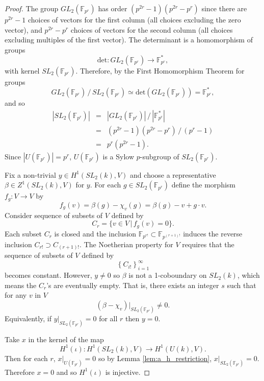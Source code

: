 \begin{proof}
	The group $GL_2(\mathbb{F}_{p^r})$ has order $(p^{2r} - 1)(p^{2r} - p^r)$ since there are $p^{2r} - 1$ choices of vectors for the first column (all choices excluding the zero vector), and $p^{2r} - p^r$ choices of vectors for the second column (all choices excluding multiples of the first vector). The determinant is a homomorphism of groups
	\begin{displaymath}
		\mathrm{det}:GL_2(\mathbb{F}_{p^r}) \rightarrow \mathbb{F}^*_{p^r},
	\end{displaymath}
	with kernel $SL_2(\mathbb{F}_{p^r})$. Therefore, by the First Homomorphism Theorem for groups
	\begin{displaymath}
		GL_2(\mathbb{F}_{p^r})\,/\,SL_2(\mathbb{F}_{p^r}) \simeq \mathrm{det}(GL_2(\mathbb{F}_{p^r})) = \mathbb{F}^*_{p^r},
	\end{displaymath}
	and so
	\begin{eqnarray*}
		|SL_2(\mathbb{F}_{p^r})|
		&=& |GL_2(\mathbb{F}_{p^r})|\,/\,|\mathbb{F}^*_{p^r}|\\
		&=& (p^{2r} - 1)(p^{2r} - p^r)\,/\,(p^r - 1)\\
		&=& p^r(p^{2r} - 1).
	\end{eqnarray*}
	Since $|U(\mathbb{F}_{p^r})| = p^r$, $U(\mathbb{F}_{p^r})$ is a Sylow $p$-subgroup of $SL_2(\mathbb{F}_{p^r})$.
	
	Fix a non-trivial $y\in H^1(SL_2(k), V)$ and choose a representative $\beta\in Z^1(SL_2(k), V)$ for $y$. For each $g\in SL_2(\mathbb{F}_{p^r})$ define the morphism $f_g:V\rightarrow V$ by
	\begin{displaymath}
		f_g(v) = \beta(g) - \chi_v(g) = \beta(g) - v + g\cdot v.
	\end{displaymath}
	Consider sequence of subsets of $V$ defined by
	\begin{displaymath}
		C_r = \{v \in V \,|\, f_g(v) = 0\}.
	\end{displaymath}
	Each subset $C_r$ is closed and the inclusion $\mathbb{F}_{p^{r!}} \subset \mathbb{F}_{p^{(r+1)!}}$ induces the reverse inclusion $C_{r!} \supset C_{(r+1)!}$. The Noetherian property for $V$ requires that the sequence of subsets of $V$ defined by
	\begin{displaymath}
		\left\{C_{i!}\right\}_{i = 1}^\infty
	\end{displaymath}
	becomes constant. However, $y\neq 0$ so $\beta$ is not a 1-coboundary on $SL_2(k)$, which means the $C_r$'s are eventually empty. That is, there exists an integer $s$ such that for any $v$ in $V$
	\begin{displaymath}
		(\beta - \chi_v)|_{SL_2(\mathbb{F}_{p^s})} \neq 0.
	\end{displaymath}
	Equivalently, if $y|_{SL_2(\mathbb{F}_{p^r})} = 0$ for all $r$ then $y = 0$.
	
	Take $x$ in the kernel of the map 
	\begin{displaymath}
	 H^1(\iota) : H^1(SL_2(k), V) \rightarrow H^1(U(k), V).
       \end{displaymath}
	Then for each $r$, $x|_{U(\mathbb{F}_{p^r})} = 0$ so by Lemma \ref{lem:a_h_restriction}, $x|_{SL_2(\mathbb{F}_{p^r})} = 0$. Therefore $x=0$ and so $H^1(\iota)$ is injective.
\end{proof}


